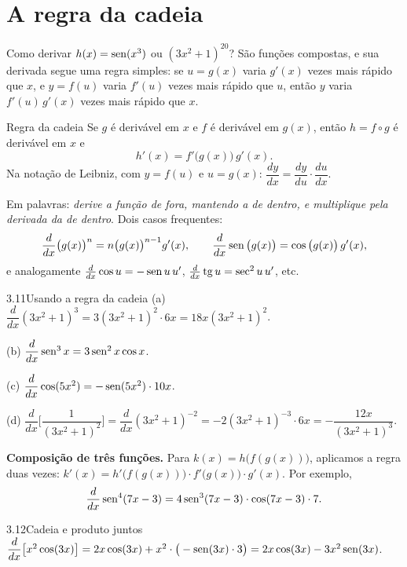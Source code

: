 \section{A regra da cadeia}

Como derivar $h(x)=\operatorname{sen}(x^3)$ ou $(3x^2+1)^{20}$? São funções compostas, e sua derivada
segue uma regra simples: se $u=g(x)$ varia $g'(x)$ vezes mais rápido que $x$, e $y=f(u)$
varia $f'(u)$ vezes mais rápido que $u$, então $y$ varia $f'(u)\,g'(x)$ vezes mais rápido que
$x$.

\begin{regra}{Regra da cadeia}
Se $g$ é derivável em $x$ e $f$ é derivável em $g(x)$, então $h=f\circ g$ é derivável em
$x$ e
\[
h'(x)=f'\big(g(x)\big)\,g'(x).
\]
Na notação de Leibniz, com $y=f(u)$ e $u=g(x)$:\qquad
$\dfrac{dy}{dx}=\dfrac{dy}{du}\cdot\dfrac{du}{dx}$.
\end{regra}

Em palavras: \emph{derive a função de fora, mantendo a de dentro, e multiplique pela
derivada da de dentro}. Dois casos frequentes:
\[
\frac{d}{dx}\big(g(x)\big)^n=n\big(g(x)\big)^{n-1}g'(x),\qquad
\frac{d}{dx}\operatorname{sen}\big(g(x)\big)=\cos\big(g(x)\big)\,g'(x),
\]
e analogamente $\frac{d}{dx}\cos u=-\operatorname{sen} u\,u'$, $\frac{d}{dx}\operatorname{tg} u=\sec^2u\,u'$, etc.

\begin{exemplo}{3.11}{Usando a regra da cadeia}
(a) $\dfrac{d}{dx}(3x^2+1)^3=3(3x^2+1)^2\cdot6x=18x(3x^2+1)^2$.

(b) $\dfrac{d}{dx}\operatorname{sen}^3x=3\operatorname{sen}^2x\cos x$.

(c) $\dfrac{d}{dx}\cos(5x^2)=-\operatorname{sen}(5x^2)\cdot10x$.

(d) $\dfrac{d}{dx}\Big[\dfrac{1}{(3x^2+1)^2}\Big]=\dfrac{d}{dx}(3x^2+1)^{-2}=-2(3x^2+1)^{-3}\cdot6x
=-\dfrac{12x}{(3x^2+1)^3}$.
\end{exemplo}

\textbf{Composição de três funções.} Para $k(x)=h\big(f(g(x))\big)$, aplicamos a regra duas
vezes: $k'(x)=h'\big(f(g(x))\big)\cdot f'\big(g(x)\big)\cdot g'(x)$. Por exemplo,
\[
\frac{d}{dx}\operatorname{sen}^4(7x-3)=4\operatorname{sen}^3(7x-3)\cdot\cos(7x-3)\cdot7 .
\]

\begin{exemplo}{3.12}{Cadeia e produto juntos}
$\dfrac{d}{dx}\big[x^2\cos(3x)\big]=2x\cos(3x)+x^2\cdot\big(-\operatorname{sen}(3x)\cdot3\big)
=2x\cos(3x)-3x^2\operatorname{sen}(3x)$.
\end{exemplo}

